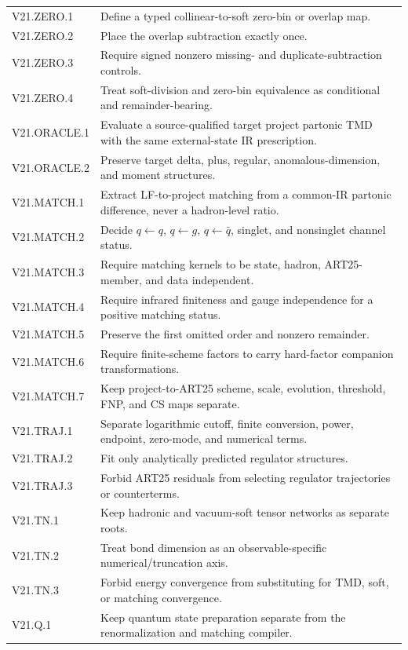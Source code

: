 \documentclass[11pt]{article}
\begin{document}
\begin{longtable}{L{0.19\textwidth}L{0.72\textwidth}}
V21.ZERO.1 & Define a typed collinear-to-soft zero-bin or overlap map.\\
V21.ZERO.2 & Place the overlap subtraction exactly once.\\
V21.ZERO.3 & Require signed nonzero missing- and duplicate-subtraction controls.\\
V21.ZERO.4 & Treat soft-division and zero-bin equivalence as conditional and remainder-bearing.\\
V21.ORACLE.1 & Evaluate a source-qualified target project partonic TMD with the same external-state IR prescription.\\
V21.ORACLE.2 & Preserve target delta, plus, regular, anomalous-dimension, and moment structures.\\
V21.MATCH.1 & Extract LF-to-project matching from a common-IR partonic difference, never a hadron-level ratio.\\
V21.MATCH.2 & Decide \(q\leftarrow q\), \(q\leftarrow g\), \(q\leftarrow\bar q\), singlet, and nonsinglet channel status.\\
V21.MATCH.3 & Require matching kernels to be state, hadron, ART25-member, and data independent.\\
V21.MATCH.4 & Require infrared finiteness and gauge independence for a positive matching status.\\
V21.MATCH.5 & Preserve the first omitted order and nonzero remainder.\\
V21.MATCH.6 & Require finite-scheme factors to carry hard-factor companion transformations.\\
V21.MATCH.7 & Keep project-to-ART25 scheme, scale, evolution, threshold, FNP, and CS maps separate.\\
V21.TRAJ.1 & Separate logarithmic cutoff, finite conversion, power, endpoint, zero-mode, and numerical terms.\\
V21.TRAJ.2 & Fit only analytically predicted regulator structures.\\
V21.TRAJ.3 & Forbid ART25 residuals from selecting regulator trajectories or counterterms.\\
V21.TN.1 & Keep hadronic and vacuum-soft tensor networks as separate roots.\\
V21.TN.2 & Treat bond dimension as an observable-specific numerical/truncation axis.\\
V21.TN.3 & Forbid energy convergence from substituting for TMD, soft, or matching convergence.\\
V21.Q.1 & Keep quantum state preparation separate from the renormalization and matching compiler.\\

\end{longtable}
\end{document}
